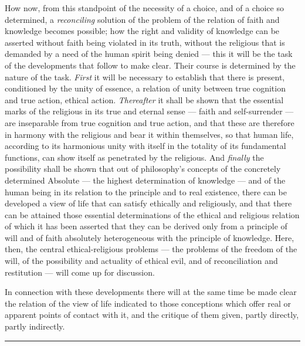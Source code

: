\documentclass[12pt,a4paper]{book}
\begin{document}
How now, from this standpoint of the necessity of a choice, and of a choice so
determined, a \emph{reconciling} solution of the problem of the relation of
faith and knowledge becomes possible; how the right and validity of knowledge
can be asserted without faith being violated in its truth, without the
religious that is demanded by a need of the human spirit being denied --- this
it will be the task of the developments that follow to make clear. Their
course is determined by the nature of the task. \emph{First} it will be
necessary to establish that there is present, conditioned by the unity of
essence, a relation of unity between true cognition and true action, ethical
action. \emph{Thereafter} it shall be shown that the essential marks of the
religious in its true and eternal sense --- faith and self-surrender --- are
inseparable from true cognition and true action, and that these are therefore
in harmony with the religious and bear it within themselves, so that human
life, according to its harmonious unity with itself in the totality of its
fundamental functions, can show itself as penetrated by the religious. And
\emph{finally} the possibility shall be shown that out of philosophy's
concepts of the concretely determined Absolute --- the highest determination
of knowledge --- and of the human being in its relation to the principle and
to real existence, there can be developed a view of life that can satisfy
ethically and religiously, and that there can be attained those essential
determinations of the ethical and religious relation of which it has been
asserted that they can be derived only from a principle of will and of faith
absolutely heterogeneous with the principle of knowledge. Here, then, the
central ethical-religious problems --- the problems of the freedom of the
will, of the possibility and actuality of ethical evil, and of reconciliation
and restitution --- will come up for discussion.

In connection with these developments there will at the same time be made
clear the relation of the view of life indicated to those conceptions which
offer real or apparent points of contact with it, and the critique of them
given, partly directly, partly indirectly.

\begin{center}\rule{2cm}{0.4pt}\end{center}
\end{document}
